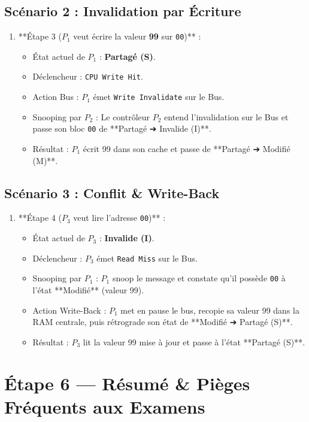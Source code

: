 \documentclass[12pt,a4paper]{article}
\begin{document}
\subsection{Scénario 2 : Invalidation par Écriture}
\begin{enumerate}
    \item **Étape 3 ($P_1$ veut écrire la valeur \textbf{99} sur \texttt{00})** :
    \begin{itemize}
        \item État actuel de $P_1$ : \textbf{Partagé (S)}.
        \item Déclencheur : \texttt{CPU Write Hit}.
        \item Action Bus : $P_1$ émet \texttt{Write Invalidate} sur le Bus.
        \item Snooping par $P_2$ : Le contrôleur $P_2$ entend l'invalidation sur le Bus et passe son bloc \texttt{00} de **Partagé ➔ Invalide (I)**.
        \item Résultat : $P_1$ écrit 99 dans son cache et passe de **Partagé ➔ Modifié (M)**.
    \end{itemize}
\end{enumerate}

\subsection{Scénario 3 : Conflit \& Write-Back}
\begin{enumerate}
    \item **Étape 4 ($P_3$ veut lire l'adresse \texttt{00})** :
    \begin{itemize}
        \item État actuel de $P_3$ : \textbf{Invalide (I)}.
        \item Déclencheur : $P_3$ émet \texttt{Read Miss} sur le Bus.
        \item Snooping par $P_1$ : $P_1$ snoop le message et constate qu'il possède \texttt{00} à l'état **Modifié** (valeur 99).
        \item Action Write-Back : $P_1$ met en pause le bus, recopie sa valeur 99 dans la RAM centrale, puis rétrograde son état de **Modifié ➔ Partagé (S)**.
        \item Résultat : $P_3$ lit la valeur 99 mise à jour et passe à l'état **Partagé (S)**.
    \end{itemize}
\end{enumerate}

\newpage
\section{Étape 6 — Résumé \& Pièges Fréquents aux Examens}
\end{document}
